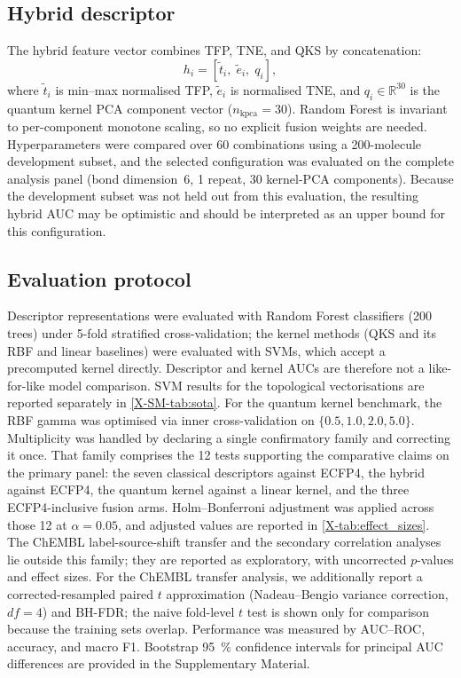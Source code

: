 \documentclass[11pt,a4paper]{article}
\begin{document}
\subsection{Hybrid descriptor}

The hybrid feature vector combines TFP, TNE, and QKS by concatenation:
\begin{equation}
h_i = \left[\tilde{t}_i,\; \tilde{e}_i,\; q_i\right],
\end{equation}
where $\tilde{t}_i$ is min--max normalised TFP, $\tilde{e}_i$ is normalised TNE, and $q_i \in \mathbb{R}^{30}$ is the quantum kernel PCA component vector ($n_{\text{kpca}}=30$). Random Forest is invariant to per-component monotone scaling, so no explicit fusion weights are needed. Hyperparameters were compared over 60 combinations using a \num{200}-molecule development subset, and the selected configuration was evaluated on the complete analysis panel (bond dimension~6, \num{1} repeat, \num{30} kernel-PCA components). Because the development subset was not held out from this evaluation, the resulting hybrid AUC may be optimistic and should be interpreted as an upper bound for this configuration.

\subsection{Evaluation protocol}

Descriptor representations were evaluated with Random Forest classifiers (\num{200} trees) under 5-fold stratified cross-validation; the kernel methods (QKS and its RBF and linear baselines) were evaluated with SVMs, which accept a precomputed kernel directly. Descriptor and kernel AUCs are therefore not a like-for-like model comparison. SVM results for the topological vectorisations are reported separately in \cref{X-SM-tab:sota}. For the quantum kernel benchmark, the RBF gamma was optimised via inner cross-validation on $\{0.5, 1.0, 2.0, 5.0\}$. Multiplicity was handled by declaring a single confirmatory family and correcting it once. That family comprises the \num{12} tests supporting the comparative claims on the primary panel: the seven classical descriptors against ECFP4, the hybrid against ECFP4, the quantum kernel against a linear kernel, and the three ECFP4-inclusive fusion arms. Holm--Bonferroni adjustment was applied across those \num{12} at $\alpha = \num{0.05}$, and adjusted values are reported in \cref{X-tab:effect_sizes}. The ChEMBL label-source-shift transfer and the secondary correlation analyses lie outside this family; they are reported as exploratory, with uncorrected $p$-values and effect sizes. For the ChEMBL transfer analysis, we additionally report a corrected-resampled paired $t$ approximation (Nadeau--Bengio variance correction, $df = 4$) and BH-FDR; the naive fold-level $t$ test is shown only for comparison because the training sets overlap. Performance was measured by AUC--ROC, accuracy, and macro F1. Bootstrap \qty{95}{\percent} confidence intervals for principal AUC differences are provided in the Supplementary Material.
\end{document}
